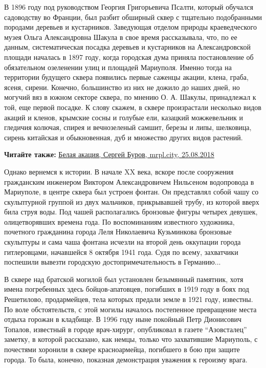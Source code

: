 В 1896 году под руководством Георгия Григорьевича Псалти, который обучался
садоводству во Франции, был разбит обширный сквер с тщательно подобранными
породами  деревьев и кустарников. Заведующая отделом природы краеведческого
музея Ольга Александровна Шакула в свое время рассказывала, что, по ее данным,
систематическая посадка деревьев и кустарников на Александровской площади
началась в 1897 году, когда ­городская дума приняла постановление об
обязательном озеленении улиц и площадей Мариуполя. Именно тогда на территории
будущего сквера появились первые саженцы акации, клена, граба, ясеня, сирени.
Конечно, большинство из них не дожило до наших дней, но могучий вяз в южном
секторе сквера, по мнению О. А. Шакулы, принадлежал  к той, еще первой посадке.
К слову скажем, в сквере произрастали несколько видов акаций и кленов, крымские
сосны и голубые ели, казацкий можжевельник и гледичия колючая, спирея и
вечнозеленый самшит, березы и липы, шелковица, сирень китайская и обыкновенная,
дуб и множество других видов растений.

\textbf{Читайте также:} \href{https://archive.org/details/25_03_2018.sergij_burov.mrpl_city.belaja_akacia}{%
Белая акация, Сергей Буров, mrpl.city, 25.08.2018}

Однако вернемся к истории. В начале XX века, вскоре после сооружения
гражданским инженером Виктором Александровичем Нильсеном водопровода в
Мариуполе,  в центре сквера был устроен фонтан. Он представлял собой чашу со
скульптурной группой из двух мальчиков, прикрывавшей трубу, из которой вверх
била струя воды. Под чашей располагались бронзовые фигуры четырех  девушек,
олицетворявших времена года. По воспоминаниям известного художника, почетного
гражданина города Леля Николаевича  Кузьминкова бронзовые скульптуры и сама
чаша фонтана исчезли на второй день оккупации города гитле­ровцами, начавшейся
8 октября 1941 года. Судя по всему, захватчики поспешили вывезти городскую
достопримечательность в Германию...


В сквере над братской могилой был установлен безымянный памятник, хотя имена
погребенных здесь бойцов-апатовцев, погибших в 1919 году в боях под Решетилово,
продармейцев, тела которых предали земле в 1921 году, известны. По воле
обстоятельств, с этой могилы началось постепенное превращение места отдыха
горожан в кладбище. В 1996 году ныне покойный Петр Дионисович Топалов,
известный в городе врач-хирург, опубликовал в газете \enquote{Азовсталец} заметку, в
которой рассказано, как немцы, только что захватившие Мариуполь, с почестями
хоронили в сквере красноармейца, погибшего в бою при защите города. То была,
конечно, показная демонстрация уважения к героизму врага.

